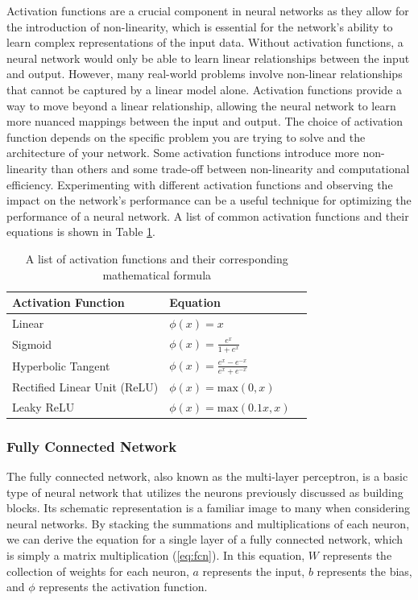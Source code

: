 Activation functions are a crucial component in neural networks as they allow for the introduction of non-linearity, which is essential for the network's ability to learn complex representations of the input data. Without activation functions, a neural network would only be able to learn linear relationships between the input and output. However, many real-world problems involve non-linear relationships that cannot be captured by a linear model alone. Activation functions provide a way to move beyond a linear relationship, allowing the neural network to learn more nuanced mappings between the input and output. The choice of activation function depends on the specific problem you are trying to solve and the architecture of your network. Some activation functions introduce more non-linearity than others and some trade-off between non-linearity and computational efficiency. Experimenting with different activation functions and observing the impact on the network's performance can be a useful technique for optimizing the performance of a neural network. A list of common activation functions and their equations is shown in Table \ref{tab:activation-functions}.

\begin{table}[H]
    \caption{A list of activation functions and their corresponding mathematical formula} \label{tab:activation-functions}
    \begin{tabularx}{\columnwidth}{|X|X|X|}
        \hline
        {\bf Activation Function} & {\bf Equation} \\ \hline 
        Linear & $\phi(x) = x$ \\\hline
        Sigmoid & $\phi(x) = \frac{e^{x}}{1 + e^{x}}$\\ \hline 
        Hyperbolic Tangent & $\phi(x) = \frac{e^x - e^{-x}}{e^{x} + e^{-x}}$\\ \hline 
        Rectified Linear Unit (ReLU) & $\phi(x) = \text{max}(0,x)$\\ \hline 
        Leaky ReLU & $\phi(x) = \text{max}(0.1x,x)$ \\ \hline 
    \end{tabularx}
\end{table}

\subsubsection{Fully Connected Network}
The fully connected network, also known as the multi-layer perceptron, is a basic type of neural network that utilizes the neurons previously discussed as building blocks. Its schematic representation is a familiar image to many when considering neural networks. By stacking the summations and multiplications of each neuron, we can derive the equation for a single layer of a fully connected network, which is simply a matrix multiplication (\cref{eq:fcn}). In this equation, $W$ represents the collection of weights for each neuron, $a$ represents the input, $b$ represents the bias, and $\phi$ represents the activation function.


